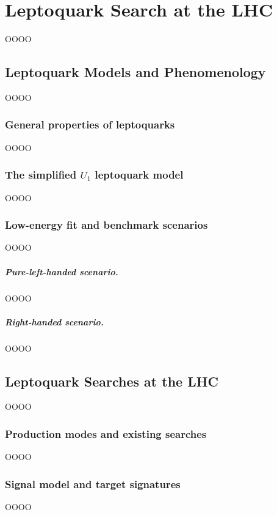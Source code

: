 \chapter{Leptoquark Search at the LHC}
\label{chap:chapter-3}

OOOO

\section{Leptoquark Models and Phenomenology}
\label{heading:Chapters-CH3-2}

OOOO

\subsection{General properties of leptoquarks}
\label{heading:Chapters-CH3-3}

OOOO

\subsection{The simplified $U_{1}$ leptoquark model}
\label{heading:Chapters-CH3-4}

OOOO

\subsection{Low-energy fit and benchmark scenarios}
\label{heading:Chapters-CH3-5}

OOOO

\paragraph{Pure-left-handed scenario.}
\label{heading:Chapters-CH3-6}

OOOO

\paragraph{Right-handed scenario.}
\label{heading:Chapters-CH3-7}

OOOO

\section{Leptoquark Searches at the LHC}
\label{heading:Chapters-CH3-8}

OOOO

\subsection{Production modes and existing searches}
\label{heading:Chapters-CH3-9}

OOOO

\subsection{Signal model and target signatures}
\label{heading:Chapters-CH3-10}

OOOO

